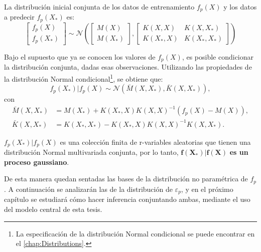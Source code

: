 La distribución inicial conjunta de los datos de entrenamiento $f_p(X)$ y los datos a predecir $f_p(X_*)$ es: 
\begin{equation*}
    \left[
        \begin{array}{c}
        f_p(X)  \\
        f_p(X_*) 
        \end{array}
    \right]  
    \sim \mathcal{N}  
    \left(
        \left[
            \begin{array}{c} 
            M(X) \\ 
            M(X_*) 
            \end{array}
        \right],
        \left[
            \begin{array}{cc}
            K(X,X) & K(X,X_*)  \\
            K(X_*,X) & K(X_*,X_*) 
            \end{array}
        \right]
    \right) 
\end{equation*}


Bajo el supuesto que ya se conocen los valores de $f_p(X)$, es posible condicionar la distribución conjunta, dadas esas observaciones. Utilizando las propiedades de la distribución Normal condicional\footnote{La especificaci\'on de la distribuci\'on Normal condicional se puede encontrar en el \autoref{chap:Distributions}.}, se obtiene que:
\begin{equation*}
    f_p(X_*)|f_p(X) 
    \sim \mathcal{N}
    (\bar{M}(X,X_*),\bar{K}(X,X_*)),
\end{equation*}
con
\begin{equation*}
\begin{aligned}
    \bar{M}(X,X_*) &= M(X_*) + K(X_*,X)K(X,X)^{-1}(f_p(X) - M(X)), \\
    \bar{K}(X,X_*) &= K(X_*,X_*) - K(X_*,X)K(X,X)^{-1}K(X,X_*).
\end{aligned}
\end{equation*}

\begin{obs*}
    $f_p(X_*)|f_p(X)$ es una colección finita de r-variables aleatorias que tienen una distribuci\'on Normal multivariada conjunta, por lo tanto, $\bm{f(X_*)|f(X)}$ \textbf{es un proceso gaussiano}.
\end{obs*}

De esta manera quedan sentadas las bases de la distribuci\'on no param\'etrica de $f_p$. A continuaci\'on se analizar\'an las de la distribuci\'on de $\varepsilon_p$, y en el pr\'oximo cap\'itulo se estudiar\'a c\'omo hacer inferencia conjuntando ambas, mediante el uso del modelo central de esta tesis.

